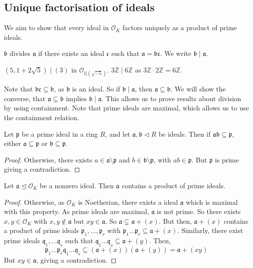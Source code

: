 \subsection{Unique factorisation of ideals}
We aim to show that every ideal in \( \mathcal O_K \) factors uniquely as a product of prime ideals.
\begin{definition}
    \( \mathfrak b \) divides \( \mathfrak a \) if there exists an ideal \( \mathfrak c \) such that \( \mathfrak a = \mathfrak b \mathfrak c \).
    We write \( \mathfrak b \mid \mathfrak a \).
\end{definition}
\begin{example}
    \( (5, 1 + 2\sqrt{5}) \mid (3) \) in \( \mathcal O_{\mathbb Q(\sqrt{-5})} \).
    \( 3\mathbb Z \mid 6\mathbb Z \) as \( 3\mathbb Z \cdot 2\mathbb Z = 6\mathbb Z \).
\end{example}
Note that \( \mathfrak b \mathfrak c \subseteq \mathfrak b \), as \( \mathfrak b \) is an ideal.
So if \( \mathfrak b \mid \mathfrak a \), then \( \mathfrak a \subseteq \mathfrak b \).
We will show the converse, that \( \mathfrak a \subseteq \mathfrak b \) implies \( \mathfrak b \mid \mathfrak a \).
This allows us to prove results about division by using containment.
Note that prime ideals are maximal, which allows us to use the containment relation.
\begin{lemma}
    Let \( \mathfrak p \) be a prime ideal in a ring \( R \), and let \( \mathfrak a, \mathfrak b \triangleleft R \) be ideals.
    Then if \( \mathfrak a \mathfrak b \subseteq \mathfrak p \), either \( \mathfrak a \subseteq \mathfrak p \) or \( \mathfrak b \subseteq \mathfrak p \).
\end{lemma}
\begin{proof}
    Otherwise, there exists \( a \in \mathfrak a \setminus \mathfrak p \) and \( b \in \mathfrak b \setminus \mathfrak p \), with \( ab \in \mathfrak p \).
    But \( \mathfrak p \) is prime giving a contradiction.
\end{proof}
\begin{lemma}
    Let \( \mathfrak a \trianglelefteq \mathcal O_K \) be a nonzero ideal.
    Then \( \mathfrak a \) contains a product of prime ideals.
\end{lemma}
\begin{proof}
    Otherwise, as \( \mathcal O_K \) is Noetherian, there exists a ideal \( \mathfrak a \) which is maximal with this property.
    As prime ideals are maximal, \( \mathfrak a \) is not prime.
    So there exists \( x, y \in \mathcal O_K \) with \( x, y \not\in \mathfrak a \) but \( xy \in \mathfrak a \).
    So \( \mathfrak a \subsetneq \mathfrak a + (x) \).
    But then, \( \mathfrak a + (x) \) contains a product of prime ideals \( \mathfrak p_1, \dots, \mathfrak p_r \) with \( \mathfrak p_1\dots \mathfrak p_r \subseteq \mathfrak a + (x) \).
    Similarly,  there exist prime ideals \( \mathfrak q_1, \dots \mathfrak q_s \) such that \( \mathfrak q_1 \dots\mathfrak q_s \subseteq \mathfrak a + (y) \).
    Then,
    \[ \mathfrak p_1\dots \mathfrak p_r\mathfrak q_1 \dots\mathfrak q_s \subseteq (\mathfrak a + (x))(\mathfrak a + (y)) = \mathfrak a + (xy) \]
    But \( xy \in \mathfrak a \), giving a contradiction.
\end{proof}

